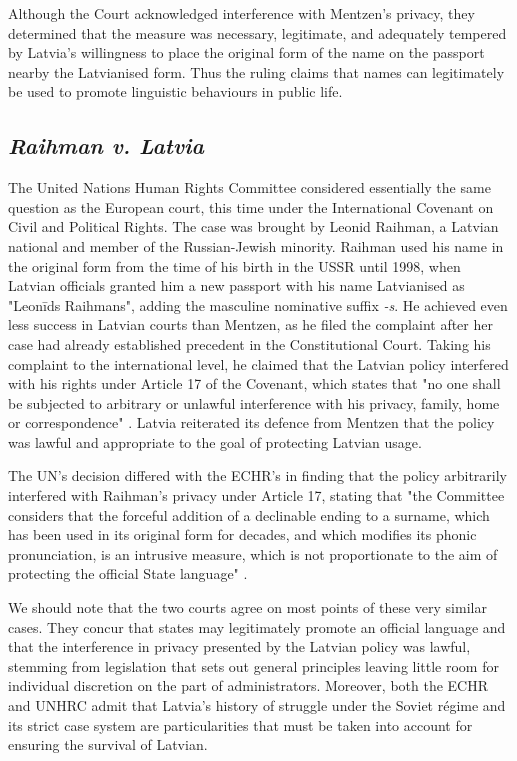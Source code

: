 Although the Court acknowledged interference with Mentzen's privacy, they
determined that the measure was necessary, legitimate, and adequately tempered
by Latvia's willingness to place the original form of the name on the passport
nearby the Latvianised form. Thus the ruling claims that names can legitimately
be used to promote linguistic behaviours in public life.

\subsection{\textit{Raihman v. Latvia}}

The United Nations Human Rights Committee considered essentially the
same question as the European court, this time under the International Covenant
on Civil and Political Rights. The case was brought by Leonid Raihman, a
Latvian national and member of the Russian-Jewish minority. Raihman used his
name in the original form from the time of his birth in the USSR until 1998,
when Latvian officials granted him a new passport with his name Latvianised as
"Leonīds Raihmans", adding the masculine nominative suffix \textit{-s}. He
achieved even less success in Latvian courts than Mentzen, as he filed the
complaint after her case had already established precedent in the
Constitutional Court. Taking his complaint to the international level, he
claimed that the Latvian policy interfered with his rights under Article 17 of
the Covenant, which states that "no one shall be subjected to arbitrary or
unlawful interference with his privacy, family, home or correspondence"
\parencite{iccpr}. Latvia reiterated its defence from Mentzen that the policy
was lawful and appropriate to the goal of protecting Latvian usage.

The UN's decision differed with the ECHR's in finding that the policy
arbitrarily interfered with Raihman's privacy under Article 17, stating that
"the Committee considers that the forceful addition of a declinable ending to a
surname, which has been used in its original form for decades, and which
modifies its phonic pronunciation, is an intrusive measure, which is not
proportionate to the aim of protecting the official State language"
\parencite[8.3]{raihman10}.

We should note that the two courts agree on most points of these very similar
cases. They concur that states may legitimately promote an official language
and that the interference in privacy presented by the Latvian policy was
lawful, stemming from legislation that sets out general principles leaving
little room for individual discretion on the part of administrators. Moreover,
both the ECHR and UNHRC admit that Latvia's history of struggle under the
Soviet régime and its strict case system are particularities that must be taken
into account for ensuring the survival of Latvian.

